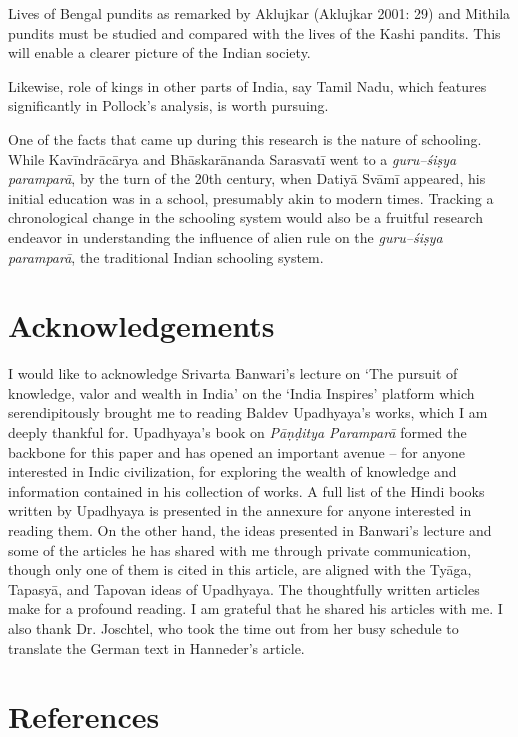  \item Lives of Bengal pundits as remarked by Aklujkar (Aklujkar 2001: 29) and Mithila pundits must be studied and compared with the lives of the Kashi pandits. This will enable a clearer picture of the Indian society.

 \item Likewise, role of kings in other parts of India, say Tamil Nadu, which features significantly in Pollock’s analysis, is worth pursuing.

 \item One of the facts that came up during this research is the nature of schooling. While Kavīndrācārya and Bhāskarānanda Sarasvatī went to a \textit{guru–śiṣya paramparā}, by the turn of the 20th century, when Datiyā Svāmī appeared, his initial education was in a school, presumably akin to modern times. Tracking a chronological change in the schooling system would also be a fruitful research endeavor in understanding the influence of alien rule on the \textit{guru–śiṣya paramparā}, the traditional Indian schooling system.



\section*{Acknowledgements}

I would like to acknowledge Srivarta Banwari’s lecture on ‘The pursuit of knowledge, valor and wealth in India’ on the ‘India Inspires’ platform which serendipitously brought me to reading Baldev Upadhyaya’s works, which I am deeply thankful for. Upadhyaya’s book on \textit{Pāṇḍitya Paramparā} formed the backbone for this paper and has opened an important avenue – for anyone interested in Indic civilization, for exploring the wealth of knowledge and information contained in his collection of works. A full list of the Hindi books written by Upadhyaya is presented in the annexure for anyone interested in reading them. On the other hand, the ideas presented in Banwari’s lecture and some of the articles he has shared with me through private communication, though only one of them is cited in this article, are aligned with the Tyāga, Tapasyā, and Tapovan ideas of Upadhyaya. The thoughtfully written articles make for a profound reading. I am grateful that he shared his articles with me. I also thank Dr. Joschtel, who took the time out from her busy schedule to translate the German text in Hanneder’s article.


\section*{References}


